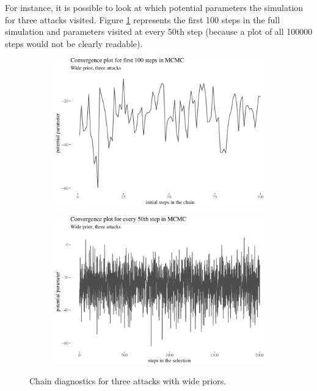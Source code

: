 \documentclass[10pt,]{scrartcl}
\begin{document}
For instance, it is possible to look at which potential parameters the
simulation for three attacks visited. Figure \ref{fig:chains} represents
the first 100 steps in the full simulation and parameters visited at
every 50th step (because a plot of all 100000 steps would not be clearly
readable).

\begin{figure}[!ht]
\begin{subfigure}[!ht]{0.45\textwidth}

\begin{center}\includegraphics[width=1\linewidth]{redditAnalysisWalkthrough_files/figure-latex/unnamed-chunk-49-1} \end{center}
\end{subfigure} \hfill
\begin{subfigure}[!ht]{0.45\textwidth}

\begin{center}\includegraphics[width=1\linewidth]{redditAnalysisWalkthrough_files/figure-latex/unnamed-chunk-50-1} \end{center}
\end{subfigure}
\caption{Chain diagnostics for three attacks with wide priors.}
\label{fig:chains}
\end{figure}
\end{document}
